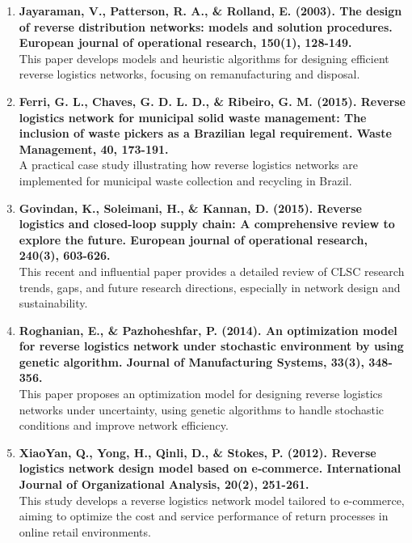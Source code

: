 \documentclass[12pt]{article}
\begin{document}
\begin{enumerate}
    \item \textbf{Jayaraman, V., Patterson, R. A., \& Rolland, E. (2003). The design of reverse distribution networks: models and solution procedures. European journal of operational research, 150(1), 128-149.} \\[0.5em]
    {\small This paper develops models and heuristic algorithms for designing efficient reverse logistics networks, focusing on remanufacturing and disposal.}

    \item \textbf{Ferri, G. L., Chaves, G. D. L. D., \& Ribeiro, G. M. (2015). Reverse logistics network for municipal solid waste management: The inclusion of waste pickers as a Brazilian legal requirement. Waste Management, 40, 173-191.} \\[0.5em]
    {\small A practical case study illustrating how reverse logistics networks are implemented for municipal waste collection and recycling in Brazil.}

    \item \textbf{Govindan, K., Soleimani, H., \& Kannan, D. (2015). Reverse logistics and closed-loop supply chain: A comprehensive review to explore the future. European journal of operational research, 240(3), 603-626.} \\[0.5em]
    {\small This recent and influential paper provides a detailed review of CLSC research trends, gaps, and future research directions, especially in network design and sustainability.}

    \item \textbf{Roghanian, E., \& Pazhoheshfar, P. (2014). An optimization model for reverse logistics network under stochastic environment by using genetic algorithm. Journal of Manufacturing Systems, 33(3), 348-356.} \\[0.5em]
    {\small This paper proposes an optimization model for designing reverse logistics networks under uncertainty, using genetic algorithms to handle stochastic conditions and improve network efficiency.}
    
    \item \textbf{XiaoYan, Q., Yong, H., Qinli, D., \& Stokes, P. (2012). Reverse logistics network design model based on e‐commerce. International Journal of Organizational Analysis, 20(2), 251-261.}\\[0.5em]
    {\small This study develops a reverse logistics network model tailored to e-commerce, aiming to optimize the cost and service performance of return processes in online retail environments.}
\end{enumerate}
\end{document}
